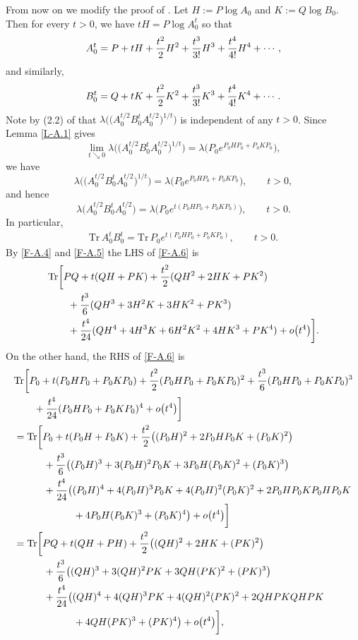 \documentclass[11pt,reqno]{article}
\numberwithin{equation}{section}
\def\Tr{\mathrm{Tr}}
\begin{document}
From now on we modify the proof of \cite[Theorem 2.1]{Hi}. Let $H:=P\log A_0$ and $K:=Q\log B_0$. Then for every
$t>0$, we have $tH=P\log A_0^t$ so that
\begin{align}\label{F-A.4}
A_0^t=P+tH+{t^2\over2}H^2+{t^3\over3!}H^3+{t^4\over4!}H^4+\cdots,
\end{align}
and similarly,
\begin{align}\label{F-A.5}
B_0^t=Q+tK+{t^2\over2}K^2+{t^3\over3!}K^3+{t^4\over4!}K^4+\cdots.
\end{align}
Note by (2.2) of \cite{Hi} that $\lambda\bigl(\bigl(A_0^{t/2}B_0^tA_0^{t/2}\bigr)^{1/t}\bigr)$ is independent of any
$t>0$. Since Lemma \ref{L-A.1} gives
\[
\lim_{t\searrow0}\lambda\bigl(\bigl(A_0^{t/2}B_0^tA_0^{t/2}\bigr)^{1/t}\bigr)
=\lambda\bigl(P_0e^{P_0HP_0+P_0KP_0}\bigr),
\]
we have
\[
\lambda\bigl(\bigl(A_0^{t/2}B_0^tA_0^{t/2}\bigr)^{1/t}\bigr)
=\lambda\bigl(P_0e^{P_0HP_0+P_0KP_0}\bigr),\qquad t>0,
\]
and hence
\[
\lambda\bigl(A_0^{t/2}B_0^tA_0^{t/2}\bigr)
=\lambda\bigl(P_0e^{t(P_0HP_0+P_0KP_0)}\bigr),\qquad t>0.
\]
In particular,
\begin{align}\label{F-A.6}
\Tr\,A_0^tB_0^t=\Tr\,P_0e^{t(P_0HP_0+P_0KP_0)},\qquad t>0.
\end{align}
By \eqref{F-A.4} and \eqref{F-A.5} the LHS of \eqref{F-A.6} is
\begin{align}
&\Tr\biggl[PQ+t(QH+PK)+{t^2\over2}(QH^2+2HK+PK^2) \nonumber\\
&\qquad+{t^3\over6}(QH^3+3H^2K+3HK^2+PK^3) \nonumber\\
&\qquad+{t^4\over24}(QH^4+4H^3K+6H^2K^2+4HK^3+PK^4)+o\bigl(t^4\bigr)\biggr]. \label{F-A.7}
\end{align}
On the other hand, the RHS of \eqref{F-A.6} is
\begin{align}
&\Tr\biggl[P_0+t(P_0HP_0+P_0KP_0)+{t^2\over2}(P_0HP_0+P_0KP_0)^2
+{t^3\over6}(P_0HP_0+P_0KP_0)^3 \nonumber\\
&\qquad+{t^4\over24}(P_0HP_0+P_0KP_0)^4+o\bigl(t^4\bigr)\biggr] \nonumber\\
&=\Tr\biggl[P_0+t(P_0H+P_0K)+{t^2\over2}\bigl((P_0H)^2+2P_0HP_0K+(P_0K)^2\bigr) \nonumber\\
&\qquad\quad+{t^3\over6}\bigl((P_0H)^3+3(P_0H)^2P_0K+3P_0H(P_0K)^2+(P_0K)^3\bigr) \nonumber\\
&\qquad\quad+{t^4\over24}\bigl((P_0H)^4+4(P_0H)^3P_0K+4(P_0H)^2(P_0K)^2+2P_0HP_0KP_0HP_0K
\nonumber\\
&\qquad\qquad\qquad+4P_0H(P_0K)^3+(P_0K)^4\bigr)+o\bigl(t^4\bigr)\biggr] \nonumber\\
&=\Tr\biggl[PQ+t(QH+PH)+{t^2\over2}\bigl((QH)^2+2HK+(PK)^2\bigr) \nonumber\\
&\qquad\quad+{t^3\over6}\bigl((QH)^3+3(QH)^2PK+3QH(PK)^2+(PK)^3\bigr) \nonumber\\
&\qquad\quad+{t^4\over24}\bigl((QH)^4+4(QH)^3PK+4(QH)^2(PK)^2+2QHPKQHPK \nonumber\\
&\qquad\qquad\qquad+4QH(PK)^3+(PK)^4\bigr)+o\bigl(t^4\bigr)\biggr], \label{F-A.8}
\end{align}
\end{document}
